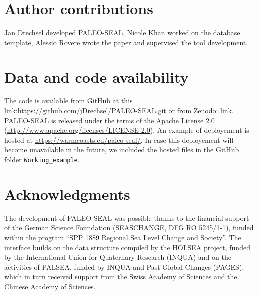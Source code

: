 \documentclass[a4paper,fleqn]{cas-dc}
\begin{document}
\section{Author contributions}
Jan Drechsel developed PALEO-SEAL, Nicole Khan worked on the database template, Alessio Rovere wrote the paper and supervised the tool development. 

\section{Data and code availability}
The code is available from GitHub at this link:\url{https://github.com/jDrechsel/PALEO-SEAL.git} or from Zenodo: link. PALEO-SEAL is released under the terms of the Apache License 2.0 (\url{http://www.apache.org/licenses/LICENSE-2.0}). An example of deployement is hosted at \url{https://warmcoasts.eu/paleo-seal/}. In case this deployement will become unavailable in the future, we included the hosted files in the GitHub folder \texttt{Working\_example}. 

\section{Acknowledgments}
The development of PALEO-SEAL was possible thanks to the financial support of the German Science Foundation (SEASCHANGE, DFG RO 5245/1-1), funded within the program 
``SPP 1889 Regional Sea Level Change and Society''. The interface builds on the data structure compiled by the HOLSEA project, funded by the International Union for Quaternary Research (INQUA) and on the activities of PALSEA, funded by INQUA and Past Global Changes (PAGES), which in turn received support from the Swiss Academy of Sciences and the Chinese Academy of Sciences.

%



\end{document}
